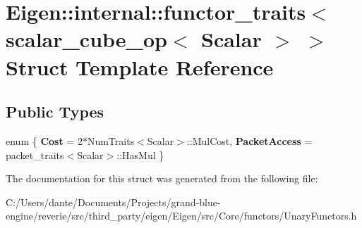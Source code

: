 \hypertarget{struct_eigen_1_1internal_1_1functor__traits_3_01scalar__cube__op_3_01_scalar_01_4_01_4}{}\section{Eigen\+::internal\+::functor\+\_\+traits$<$ scalar\+\_\+cube\+\_\+op$<$ Scalar $>$ $>$ Struct Template Reference}
\label{struct_eigen_1_1internal_1_1functor__traits_3_01scalar__cube__op_3_01_scalar_01_4_01_4}
\subsection*{Public Types}
\begin{DoxyCompactItemize}
\item 
\mbox{\label{struct_eigen_1_1internal_1_1functor__traits_3_01scalar__cube__op_3_01_scalar_01_4_01_4_aa3bb4e1281031cebb1f2a3e115e9f21a}} 
enum \{ {\bfseries Cost} = 2$\ast$\+Num\+Traits$<$Scalar$>$\+::Mul\+Cost, 
{\bfseries Packet\+Access} = packet\+\_\+traits$<$Scalar$>$\+::Has\+Mul
 \}
\end{DoxyCompactItemize}


The documentation for this struct was generated from the following file\+:\begin{DoxyCompactItemize}
\item 
C\+:/\+Users/dante/\+Documents/\+Projects/grand-\/blue-\/engine/reverie/src/third\+\_\+party/eigen/\+Eigen/src/\+Core/functors/Unary\+Functors.\+h\end{DoxyCompactItemize}
